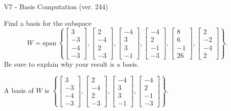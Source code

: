 \begin{exercise}
  \begin{exerciseTitle}V7 - Basis Computation (ver. 244)\end{exerciseTitle}
  \begin{exerciseStatement}
    Find a basis for the subspace 
\[W=\mathrm{span}\ \left\{\left[\begin{array}{r}
3 \\
-3 \\
-4 \\
-3
\end{array}\right] , \left[\begin{array}{r}
2 \\
-4 \\
2 \\
-3
\end{array}\right] , \left[\begin{array}{r}
-4 \\
3 \\
3 \\
-1
\end{array}\right] , \left[\begin{array}{r}
-4 \\
2 \\
-1 \\
-3
\end{array}\right] , \left[\begin{array}{r}
8 \\
6 \\
-1 \\
26
\end{array}\right] , \left[\begin{array}{r}
2 \\
-2 \\
-4 \\
2
\end{array}\right]\right\}.\]
 Be sure to explain why your result is a basis.


  \end{exerciseStatement}
  \begin{exerciseAnswer}
   A basis of \(W\) is  \(\left\{\left[\begin{array}{r}
3 \\
-3 \\
-4 \\
-3
\end{array}\right] , \left[\begin{array}{r}
2 \\
-4 \\
2 \\
-3
\end{array}\right] , \left[\begin{array}{r}
-4 \\
3 \\
3 \\
-1
\end{array}\right] , \left[\begin{array}{r}
-4 \\
2 \\
-1 \\
-3
\end{array}\right]\right\}\).
  


  \end{exerciseAnswer}
\end{exercise}